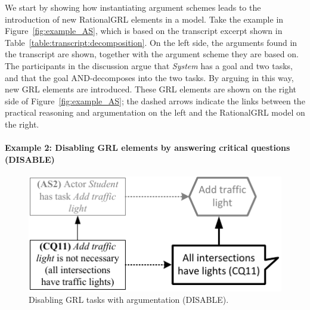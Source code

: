 We start by showing how instantiating argument schemes leads to the introduction of new RationalGRL elements in a model. Take the example in Figure~\ref{fig:example_AS}, which is based on the transcript excerpt shown in Table~\ref{table:transcript:decomposition}. On the left side, the arguments found in the transcript are shown, together with the argument scheme they are based on. The participants in the discussion argue that \emph{System} has a goal and two tasks, and that the goal AND-decomposes into the two tasks. By arguing in this way, new GRL elements are introduced. These GRL elements are shown on the right side of Figure~\ref{fig:example_AS}; the dashed arrows indicate the links between the practical reasoning and argumentation on the left and the RationalGRL model on the right. 


\paragraph{Example 2: Disabling GRL elements by answering critical questions (\textsf{DISABLE)}}

\begin{figure}[t]
\centering
\includegraphics[]{img/fig_example_disable.pdf}
\caption{Disabling GRL tasks with argumentation (\textsf{DISABLE)}.}
\label{fig:example_disable}
\end{figure}

